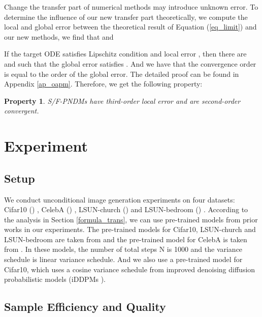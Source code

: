 \documentclass{article}
\newtheorem{property}{Property}[section]
\begin{document}
Change the transfer part of numerical methods may introduce unknown error. To determine the influence of our new transfer part theoretically, we compute the local and global error between the theoretical result of Equation (\ref{eq_limit})  and our new methods, we find that  and 

If the target ODE satisfies Lipschitz condition and local error , then there are  and  such that the global error  satisfies . And we have that the convergence order is equal to the order of the global error. The detailed proof can be found in Appendix \ref{ap_oapm}. Therefore, we get the following property:
\begin{property}
   S/F-PNDMs have third-order local error and are second-order convergent.
   \label{pro_conorder}
\end{property}











\section{Experiment}
\label{experiment}


\subsection{Setup}

We conduct unconditional image generation experiments on four datasets: Cifar10 () \citep{krizhevsky2009}, CelebA () \citep{liu2015}, LSUN-church () and LSUN-bedroom () \citep{yu2016}. According to the analysis in Section \ref{formula_trans}, we can use pre-trained models from prior works in our experiments. The pre-trained models for Cifar10, LSUN-church and LSUN-bedroom are taken from \citet{Ho2020} and the pre-trained model for CelebA is taken from \citet{Song2020a}. In these models, the number of total steps N is 1000 and the variance schedule is linear variance schedule. And we also use a pre-trained model for Cifar10, which uses a cosine variance schedule from improved denoising diffusion probabilistic models (iDDPMs \citep{Nichol2021}).

\subsection{Sample Efficiency and Quality}
\label{sec_qua_eff}
\end{document}
